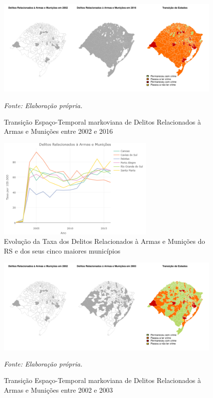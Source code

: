 \documentclass[12pt,openright,oneside,a4paper,english,french,spanish]{abntex2}
\numberwithin{table}{section} %
\numberwithin{figure}{section} %
\newcommand{\source}[1]{\textit{#1}}
\begin{document}
\begin{subappendices}
\begin{figure}[H]
\begin{center}
\includegraphics{TESE_DE_DOUTORADO_RENAN_FINAL-map_del_rel_armas_2002_2016}
\end{center}
\caption{Transição Espaço-Temporal markoviana de Delitos Relacionados à Armas e Munições entre 2002 e 2016}
\source{Fonte: Elaboração própria.}
\label{fig:mapas_del_rel_armas_markov_2002_2016}
\end{figure}

\begin{figure}[H]
\centering
\includegraphics[height=5cm,width=0.65\linewidth]{armas_cinco_maiores_municipios.png}
\caption{Evolução da Taxa dos Delitos Relacionados à Armas e Munições do RS e dos seus cinco maiores municípios}
\label{fig:evolucao_armas_cinco_maiores}
\end{figure}

\begin{figure}[H]
\begin{center}
\includegraphics{TESE_DE_DOUTORADO_RENAN_FINAL-map_del_rel_armas_2002_2003}
\end{center}
\caption{Transição Espaço-Temporal markoviana de Delitos Relacionados à Armas e Munições entre 2002 e 2003}
\source{Fonte: Elaboração própria.}
\label{fig:mapas_del_rel_armas_markov_2002_2003}
\end{figure}


\end{subappendices}
\end{document}
